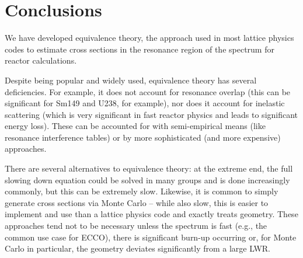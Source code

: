 \section{Conclusions}

We have developed equivalence theory, the approach used in most lattice physics codes to estimate cross sections in the resonance region of the spectrum for reactor calculations.

Despite being popular and widely used, equivalence theory has several deficiencies. For example, it does not account for resonance overlap (this can be significant for Sm149 and U238, for example), nor does it account for inelastic scattering (which is very significant in fast reactor physics and leads to significant energy loss). These can be accounted for with semi-empirical means (like resonance interference tables) or by more sophisticated (and more expensive) approaches.

There are several alternatives to equivalence theory: at the extreme end, the full slowing down equation could be solved in many groups and is done increasingly commonly, but this can be extremely slow. Likewise, it is common to simply generate cross sections via Monte Carlo -- while also slow, this is easier to implement and use than a lattice physics code and exactly treats geometry. These approaches tend not to be necessary unless the spectrum is fast (e.g., the common use case for ECCO), there is significant burn-up occurring or, for Monte Carlo in particular, the geometry deviates significantly from a large LWR.

